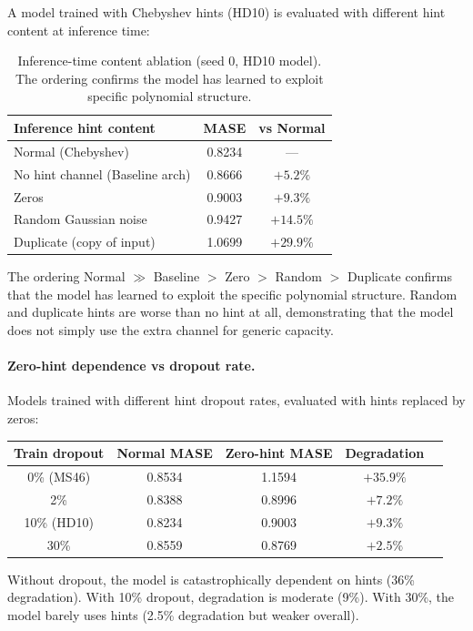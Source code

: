 \documentclass{article}
\begin{document}
A model trained with Chebyshev hints (HD10) is evaluated with different hint content at inference time:

\begin{table}[h]
\centering
\caption{Inference-time content ablation (seed 0, HD10 model). The ordering confirms the model has learned to exploit specific polynomial structure.}
\small
\begin{tabular}{lcc}
\toprule
\textbf{Inference hint content} & \textbf{MASE} & \textbf{vs Normal} \\
\midrule
Normal (Chebyshev) & 0.8234 & --- \\
No hint channel (Baseline arch) & 0.8666 & $+5.2\%$ \\
Zeros & 0.9003 & $+9.3\%$ \\
Random Gaussian noise & 0.9427 & $+14.5\%$ \\
Duplicate (copy of input) & 1.0699 & $+29.9\%$ \\
\bottomrule
\end{tabular}
\end{table}

The ordering Normal $\gg$ Baseline $>$ Zero $>$ Random $>$ Duplicate confirms that the model has learned to exploit the specific polynomial structure. Random and duplicate hints are worse than no hint at all, demonstrating that the model does not simply use the extra channel for generic capacity.

\paragraph{Zero-hint dependence vs dropout rate.} Models trained with different hint dropout rates, evaluated with hints replaced by zeros:

\begin{table}[h]
\centering
\small
\begin{tabular}{ccccc}
\toprule
\textbf{Train dropout} & \textbf{Normal MASE} & \textbf{Zero-hint MASE} & \textbf{Degradation} \\
\midrule
0\% (MS46) & 0.8534 & 1.1594 & $+35.9\%$ \\
2\% & 0.8388 & 0.8996 & $+7.2\%$ \\
10\% (HD10) & 0.8234 & 0.9003 & $+9.3\%$ \\
30\% & 0.8559 & 0.8769 & $+2.5\%$ \\
\bottomrule
\end{tabular}
\end{table}

Without dropout, the model is catastrophically dependent on hints (36\% degradation). With 10\% dropout, degradation is moderate (9\%). With 30\%, the model barely uses hints (2.5\% degradation but weaker overall).
\end{document}
